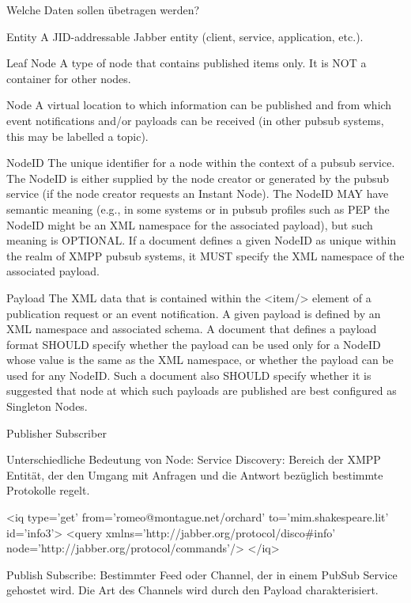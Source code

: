 \documentclass[a4paper]{article}
\begin{document}
Welche Daten sollen übetragen werden?

Entity
A JID-addressable Jabber entity (client, service, application, etc.).

Leaf Node
A type of node that contains published items only. It is NOT a container for other nodes.

Node
A virtual location to which information can be published and from which event notifications and/or payloads can be received (in other pubsub systems, this may be labelled a topic).

NodeID
The unique identifier for a node within the context of a pubsub service. The NodeID is either supplied by the node creator or generated by the pubsub service (if the node creator requests an Instant Node). The NodeID MAY have semantic meaning (e.g., in some systems or in pubsub profiles such as PEP the NodeID might be an XML namespace for the associated payload), but such meaning is OPTIONAL. If a document defines a given NodeID as unique within the realm of XMPP pubsub systems, it MUST specify the XML namespace of the associated payload.

Payload
The XML data that is contained within the <item/> element of a publication request or an event notification. A given payload is defined by an XML namespace and associated schema. A document that defines a payload format SHOULD specify whether the payload can be used only for a NodeID whose value is the same as the XML namespace, or whether the payload can be used for any NodeID. Such a document also SHOULD specify whether it is suggested that node at which such payloads are published are best configured as Singleton Nodes.

Publisher
Subscriber

Unterschiedliche Bedeutung von Node:
Service Discovery: Bereich der XMPP Entität, der den Umgang mit Anfragen und die Antwort bezüglich bestimmte Protokolle regelt.

<iq type='get'
    from='romeo@montague.net/orchard'
    to='mim.shakespeare.lit'
    id='info3'>
  <query xmlns='http://jabber.org/protocol/disco\#info' 
         node='http://jabber.org/protocol/commands'/>
</iq>
    


Publish Subscribe: Bestimmter Feed oder Channel, der in einem PubSub Service gehostet wird. Die Art des Channels wird durch den Payload charakterisiert.
\end{document}
